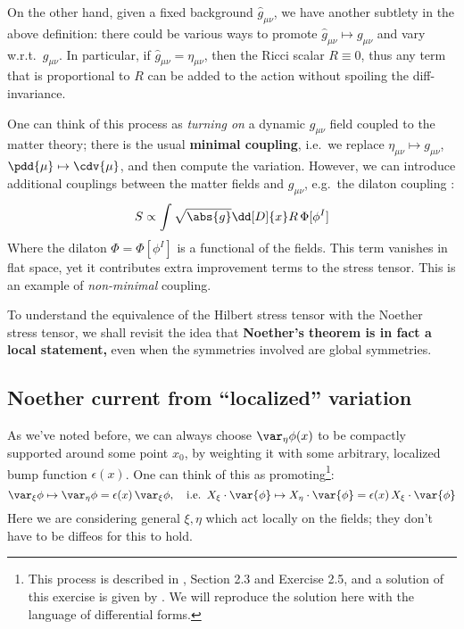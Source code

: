 \documentclass[a4paper
	,10pt
]{article}
\begin{document}
	\newparagraph
	On the other hand, given a fixed background $\hat{g}_{\mu\nu}$, we have another subtlety in the above definition: there could be various ways to promote $
		\hat{g}_{\mu\nu} \mapsto
		g_{\mu\nu}
	$ and vary w.r.t.\ $g_{\mu\nu}$. In particular, if $\hat{g}_{\mu\nu} = \eta_{\mu\nu}$, then the Ricci scalar $R \equiv 0$, thus any term that is proportional to $R$ can be added to the action without spoiling the diff-invariance. 
	
\pagebreak[4]
	
	One can think of this process as \textit{turning on} a dynamic $g_{\mu\nu}$ field coupled to the matter theory; there is the usual \textbf{minimal coupling}, i.e.~we replace $\eta_{\mu\nu} \mapsto g_{\mu\nu}$, $\pdd{\mu} \mapsto \cdv{\mu}$, and then compute the variation. However, we can introduce additional couplings between the matter fields and $g_{\mu\nu}$, e.g.~the dilaton coupling \cite{Polchinski:1998rq}:
	\begin{equation}
		S \propto \int
			\sqrt{\abs{g}} \dd[D]{x}
			R\,\Phi[\phi^I]
	\end{equation}
	Where the dilaton $\Phi = \Phi[\phi^I]$ is a functional of the fields. This term vanishes in flat space, yet it contributes extra improvement terms to the stress tensor. This is an example of \textit{non-minimal} coupling. 
	
	
	\newparagraph
	To understand the equivalence of the Hilbert stress tensor with the Noether stress tensor, we shall revisit the idea that \textbf{Noether's theorem is in fact a local statement,} even when the symmetries involved are global symmetries. 
\subsection{Noether current from ``localized'' variation}
	As we've noted before, we can always choose $\var_\eta \phi(x)$ to be compactly supported around some point $x_0$, by weighting it with some arbitrary, localized bump function $\epsilon(x)$. One can think of this as promoting\footnote{
		This process is described in \textcite{Polchinski:1998rq}, Section 2.3 and Exercise 2.5, and a solution of this exercise is given by \cite{Headrick:2008ke}. We will reproduce the solution here with the language of differential forms.
	}:
	\begin{equation}
		\var_\xi \phi
		\mapsto \var_\eta \phi
		= \epsilon(x)\,\var_\xi \phi,
	\quad\text{i.e.}\ \,
		X_\xi \cdot \var{\phi}
		\mapsto X_\eta \cdot \var{\phi}
		= \epsilon(x)\,X_\xi \cdot \var{\phi}
	\end{equation}
	Here we are considering general $\xi,\eta$ which act locally on the fields; they don't have to be diffeos for this to hold. 
	
\end{document}
